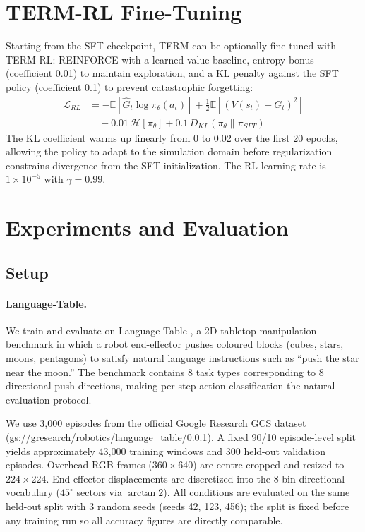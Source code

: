 \documentclass[letterpaper]{article} %
\begin{document}
\section{TERM-RL Fine-Tuning}

Starting from the SFT checkpoint, TERM can be optionally fine-tuned with TERM-RL: REINFORCE \cite{williams1992reinforce} with a learned value baseline, entropy bonus (coefficient 0.01) to maintain exploration, and a KL penalty against the SFT policy (coefficient 0.1) to prevent catastrophic forgetting:
\begin{align}
\mathcal{L}_{RL} &= -\mathbb{E}[\hat{G}_t \log \pi_\theta(a_t)] + \tfrac{1}{2}\mathbb{E}[(V(s_t){-}G_t)^2] \nonumber\\
&\quad - 0.01\,\mathcal{H}[\pi_\theta] + 0.1\,D_{KL}(\pi_\theta \| \pi_{SFT})
\end{align}
The KL coefficient warms up linearly from 0 to 0.02 over the first 20 epochs, allowing the policy to adapt to the simulation domain before regularization constrains divergence from the SFT initialization. The RL learning rate is $1 \times 10^{-5}$ with $\gamma{=}0.99$.

\section{Experiments and Evaluation}

\subsection{Setup}

\paragraph{Language-Table.}
We train and evaluate on Language-Table \cite{lynch2023languagetable}, a 2D tabletop manipulation benchmark in which a robot end-effector pushes coloured blocks (cubes, stars, moons, pentagons) to satisfy natural language instructions such as ``push the star near the moon.'' The benchmark contains 8 task types corresponding to 8 directional push directions, making per-step action classification the natural evaluation protocol.

We use 3,000 episodes from the official Google Research GCS dataset (\url{gs://gresearch/robotics/language_table/0.0.1}). A fixed 90/10 episode-level split yields approximately 43,000 training windows and 300 held-out validation episodes. Overhead RGB frames ($360{\times}640$) are centre-cropped and resized to $224{\times}224$. End-effector displacements are discretized into the 8-bin directional vocabulary ($45^\circ$ sectors via $\arctan2$). All conditions are evaluated on the same held-out split with 3 random seeds (seeds 42, 123, 456); the split is fixed before any training run so all accuracy figures are directly comparable.
\end{document}
